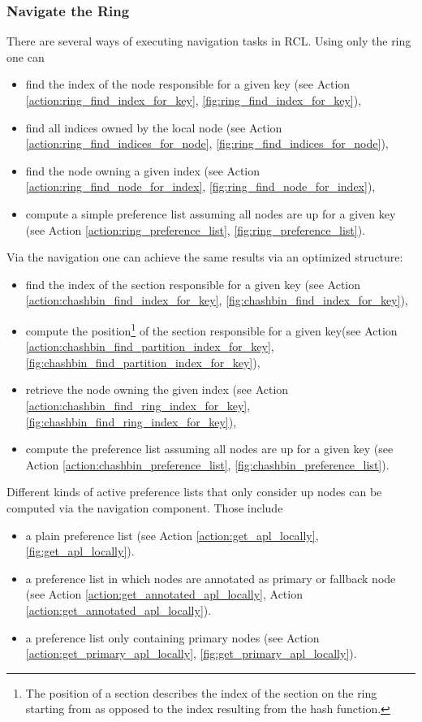 \subsubsection{Navigate the Ring}
There are several ways of executing navigation tasks in \ac{RCL}.
Using only the ring one can
\begin{itemize}
	\item find the index of the node responsible for a given key (see Action \ref{action:ring_find_index_for_key}, \cref{fig:ring_find_index_for_key}),
	\item find all indices owned by the local node (see Action \ref{action:ring_find_indices_for_node}, \cref{fig:ring_find_indices_for_node}),
	\item find the node owning a given index (see Action \ref{action:ring_find_node_for_index}, \cref{fig:ring_find_node_for_index}),
	\item compute a simple preference list assuming all nodes are up for a given key (see Action \ref{action:ring_preference_list}, \cref{fig:ring_preference_list}).
\end{itemize}
Via the navigation one can achieve the same results via an optimized structure:
\begin{itemize}
	\item find the index of the section responsible for a given key (see Action \ref{action:chashbin_find_index_for_key}, \cref{fig:chashbin_find_index_for_key}),
	\item compute the position\footnote{The position of a section describes the index of the section on the ring starting from as opposed to the index resulting from the hash function.} of the section responsible for a given key(see Action \ref{action:chashbin_find_partition_index_for_key}, \cref{fig:chashbin_find_partition_index_for_key}),
	\item retrieve the node owning the given index (see Action \ref{action:chashbin_find_ring_index_for_key}, \cref{fig:chashbin_find_ring_index_for_key}),
	\item compute the preference list assuming all nodes are up for a given key (see Action \ref{action:chashbin_preference_list}, \cref{fig:chashbin_preference_list}).
\end{itemize}
Different kinds of active preference lists that only consider up nodes can be computed via the navigation component.
Those include
\begin{itemize}
	\item a plain preference list (see Action \ref{action:get_apl_locally}, \cref{fig:get_apl_locally}).
	\item a preference list in which nodes are annotated as primary or fallback node (see Action \ref{action:get_annotated_apl_locally}, Action \ref{action:get_annotated_apl_locally}).
	\item a preference list only containing primary nodes (see Action \ref{action:get_primary_apl_locally}, \cref{fig:get_primary_apl_locally}).
\end{itemize}

